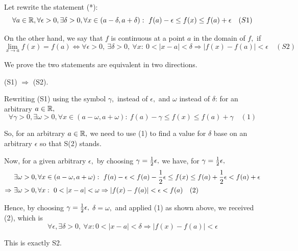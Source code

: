 \documentclass{article}
\begin{document}
\begin{soln}
    Let rewrite the statement (*):
    \[
        \forall a \in \mathbb R, \forall \epsilon > 0, \exists \delta > 0, \forall x \in (a-\delta, a+\delta):\ f(a) - \epsilon \le f(x) \le f(a) + \epsilon \quad(S1)
    \]

    On the other hand, we say that $f$ is continuous at a point $a$ in the domain of $f,$ if 
    \[
        \lim_{x \rightarrow a} f(x) = f(a) \Leftrightarrow 
        \forall \epsilon > 0,\ \exists \delta > 0,\ \forall x:\  0 < |x-a| < \delta \Rightarrow |f(x)-f(a)| < \epsilon \quad (S2)
    \]
    
    We prove the two statements are equivalent in two directions.

    \begin{claim*}
        (S1) $\Rightarrow$ (S2).
    \end{claim*}
    \begin{subproof}
        Rewriting (S1) using the symbol $\gamma,$ instead of $\epsilon,$ and $\omega$ instead of $\delta$: for an arbitrary $a \in \mathbb R,$
        \[
            \forall \gamma > 0, \exists \omega > 0, \forall x \in (a-\omega, a+\omega):\ f(a) - \gamma \le f(x) \le f(a) + \gamma \quad (1)
        \]
    
        So, for an arbitrary $a \in \mathbb R,$ we need to use (1) to find a value for $\delta$ base on an arbitrary $\epsilon$ so that S(2) stands.
        
        Now, for a given arbitrary $\epsilon,$ by choosing $\gamma = \frac{1}{2} \epsilon,$ we have, for $\gamma = \frac{1}{2} \epsilon,$
        \[
            \begin{aligned}
                &\exists \omega > 0, \forall x \in (a-\omega, a+\omega):\ f(a) - \epsilon < f(a) - \frac{1}{2}\epsilon \le f(x) \le f(a) + \frac{1}{2}\epsilon < f(a) + \epsilon\\
                \Rightarrow\ &\exists \omega > 0, \forall x:\  0 < |x-a| < \omega \Rightarrow |f(x) - f(a)| < \epsilon < f(a) \quad (2)
            \end{aligned}
        \]

        Hence, by choosing  $\gamma = \frac{1}{2} \epsilon,$ $\delta = \omega,$ and applied (1) as shown above, we received (2), which is
        \[
            \forall \epsilon, \exists \delta > 0,\ \forall x:  0 < |x-a| < \delta \Rightarrow |f(x)-f(a)| < \epsilon
        \]

        This is exactly S2.
    \end{subproof}


\end{soln}
\end{document}
